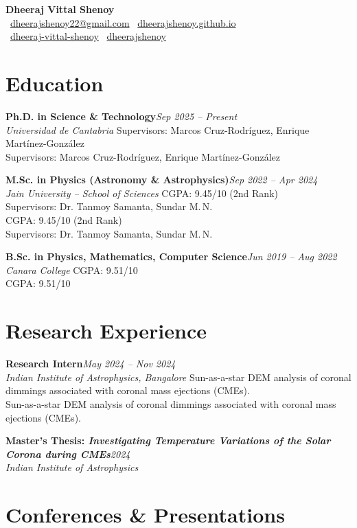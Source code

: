 \documentclass[10.5pt,a4paper]{article}
\newcommand{\entry}[4]{%
  \noindent\textbf{#1}\hfill\textit{#3}\\[2pt]
  \textit{#2}%
  \def\tmp{#4}\ifx\tmp\empty\else\\[3pt]#4\fi
}
\begin{document}
\begin{center}
    {\Huge \bfseries Dheeraj Vittal Shenoy}\\[0.5em]
    \small
    \faEnvelope\ \href{mailto:dheerajshenoy22@gmail.com}{dheerajshenoy22@gmail.com} \quad
    \faGlobe\ \href{https://dheerajshenoy.github.io}{dheerajshenoy.github.io}\\[0.3em]
    \faLinkedin\ \href{https://linkedin.com/in/dheeraj-vittal-shenoy}{dheeraj-vittal-shenoy} \quad
    \faGithub\ \href{https://github.com/dheerajshenoy}{dheerajshenoy}
\end{center}

\section*{Education}

\entry{Ph.D. in Science \& Technology}{Universidad de Cantabria}{Sep 2025 -- Present}{
    Supervisors: Marcos Cruz-Rodr\'iguez, Enrique Mart\'inez-Gonz\'alez
}

\vspace{0.6em}
\entry{M.Sc. in Physics (Astronomy \& Astrophysics)}{Jain University -- School of Sciences}{Sep 2022 -- Apr 2024}{
    CGPA: 9.45/10 (2nd Rank)\\
    Supervisors: Dr. Tanmoy Samanta, Sundar M.\,N.
}

\vspace{0.6em}
\entry{B.Sc. in Physics, Mathematics, Computer Science}{Canara College}{Jun 2019 -- Aug 2022}{
    CGPA: 9.51/10
}

\section*{Research Experience}

\entry{Research Intern}{Indian Institute of Astrophysics, Bangalore}{May 2024 -- Nov 2024}{
    Sun-as-a-star DEM analysis of coronal dimmings associated with coronal mass ejections (CMEs).
}

\vspace{0.6em}
\entry{Master's Thesis: \textit{Investigating Temperature Variations of the Solar Corona during CMEs}}{Indian Institute of Astrophysics}{2024}{}

\section*{Conferences \& Presentations}
\end{document}
